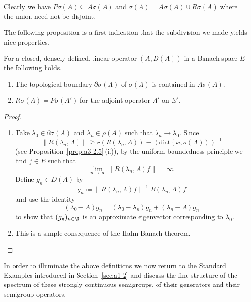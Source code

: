 Clearly we have $P\sigma(A) \subseteq A\sigma(A)$ and $\sigma(A) = A\sigma(A) \cup R\sigma(A)$ where the union need not be disjoint.

The following proposition is a first indication that the subdivision we made yields nice properties.
\begin{proposition}\label{prop:a3-2.2}
For a closed, densely defined, linear operator $(A,D(A))$ in a Banach space $E$ the following holds.
\begin{enumerate}[\upshape (i)]

\item
The topological boundary $\partial\sigma(A)$ of\/ $\sigma(A)$ is contained in $A\sigma(A)$.

\item
{}
$R\sigma(A) = P\sigma(A')$ for the adjoint operator $A'$ on $E'$.

\end{enumerate}
\end{proposition}
\begin{proof}
\begin{enumerate}[\upshape (i), wide, labelindent=.25em]

\item 
Take $\lambda_{0} \in \partial\sigma(A)$ and $\lambda_{n} \in \rho(A)$ such that $\lambda_{n} \to \lambda_{0}$.
Since 
%
\[
	 \|R(\lambda_{n},A)\| \geq r(R(\lambda_{n},A)) = (\text{dist}(x,\sigma(A)))^{-1} 
\]
%
(see Proposition~\ref{prop:a3-2.5}\,(ii)), by the uniform boundedness principle we find $f \in E$ such that
\[
	\lim_{n \to \infty}\|R(\lambda_n ,A)f\| = \infty .
\]
Define $g_{n} \in D(A)$ by
\[
g_{n} \coloneq \|R(\lambda_{n},A)f\|^{-1} R(\lambda_{n},A)f
\]
and use the identity
\[
	(\lambda_{0} - A)g_{n} = (\lambda_{0} - \lambda_{n})g_{n} + (\lambda_{n} - A)g_{n}
\]
to show that $(g_{n})_{n \in \N}$ is an approximate eigenvector corresponding to $\lambda_{0}$.

\item 
This is a simple consequence of the Hahn-Banach theorem.
\qedhere
\end{enumerate}
\end{proof}
In order to illuminate the above definitions we now return to the Standard Examples introduced in Section~\ref{sec:a1-2} and discuss the fine structure of the spectrum of these strongly continuous semigroups, \ie of their generators and their semigroup operators.

